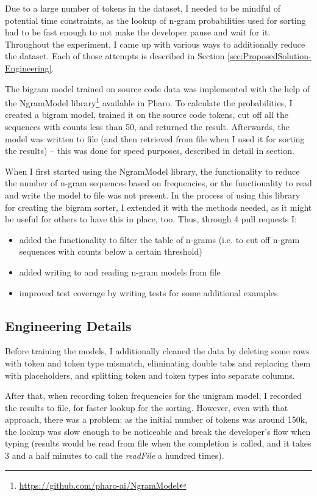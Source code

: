 \documentclass[sigplan,screen]{acmart}
\begin{document}
Due to a large number of tokens in the dataset, I needed to be mindful of potential time constraints, as the lookup of n-gram probabilities used for sorting had to be fast enough to not make the developer pause and wait for it. Throughout the experiment, I came up with various ways to additionally reduce the dataset. Each of those attempts is described in Section \ref{sec:ProposedSolution-Engineering}.

The bigram model trained on source code data was implemented with the help of the NgramModel library\footnote{\url{https://github.com/pharo-ai/NgramModel}} available in Pharo. To calculate the probabilities, I created a bigram model, trained it on the source code tokens, cut off all the sequences with counts less than 50, and returned the result. Afterwards, the model was written to file (and then retrieved from file when I used it for sorting the results) -- this was done for speed purposes, described in detail in section.

When I first started using the NgramModel library, the functionality to reduce the number of n-gram sequences based on frequencies, or the functionality to read and write the model to file was not present. In the process of using this library for creating the bigram sorter, I extended it with the methods needed, as it might be useful for others to have this in place, too. Thus, through 4 pull requests I:
\begin{itemize}
    \item added the functionality to filter the table of n-grams (i.e. to cut off n-gram sequences with counts below a certain threshold)
    \item added writing to and reading n-gram models from file
    \item improved test coverage by writing tests for some additional examples
\end{itemize}

\subsection{Engineering Details}
Before training the models, I additionally cleaned the data by deleting some rows with token and token type mismatch, eliminating double tabs and replacing them with placeholders, and splitting token and token types into separate columns.

After that, when recording token frequencies for the unigram model, I recorded the results to file, for faster lookup for the sorting. However, even with that approach, there was a problem: as the initial number of tokens was around 150k, the lookup was slow enough to be noticeable and break the developer's flow when typing (results would be read from file when the completion is called, and it takes 3 and a half minutes to call the \textit{readFile} a hundred times).
\end{document}
